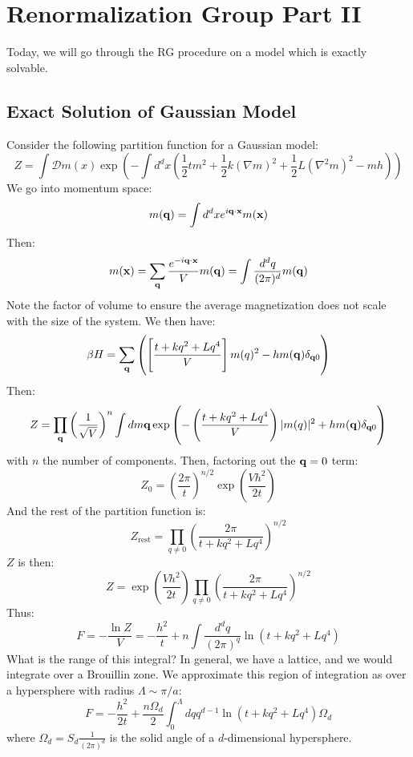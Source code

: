 \section{Renormalization Group Part II}
Today, we will go through the RG procedure on a model which is exactly solvable. 

\subsection{Exact Solution of Gaussian Model}
Consider the following partition function for a Gaussian model:
\begin{equation}
    Z = \int \mathcal{D}m(x)\exp\left(-\int d^dx \left(\frac{1}{2}tm^2 + \frac{1}{2}k(\nabla m)^2 + \frac{1}{2}L(\nabla^2 m)^2 - mh\right)\right)
\end{equation}
We go into momentum space:
\begin{equation}
    m(\mathbf{q}) = \int d^dx e^{i\mathbf{q} \cdot \mathbf{x}}m(\mathbf{x})
\end{equation}
Then:
\begin{equation}
    m(\mathbf{x}) = \sum_{\mathbf{q}}\frac{e^{-i\mathbf{q} \cdot \mathbf{x}}}{V}m(\mathbf{q}) = \int \frac{d^d q}{(2\pi)^d}m(\mathbf{q})
\end{equation}
Note the factor of volume to ensure the average magnetization does not scale with the size of the system. We then have:
\begin{equation}
    \beta H = \sum_{\mathbf{q}}\left(\left[\frac{t + kq^2 + Lq^4}{V}\right]m(q)^2 - hm(\mathbf{q})\delta_{\mathbf{q}0}\right)
\end{equation}
Then:
\begin{equation}
    Z = \prod_{\mathbf{q}}\left(\frac{1}{\sqrt{V}}\right)^n \int dm\mathbf{q} \exp\left(-\left(\frac{t + kq^2 + Lq^4}{V}\right)\lvert m(q) \rvert^2 + hm(\mathbf{q})\delta_{\mathbf{q}0}\right)
\end{equation}
with $n$ the number of components. Then, factoring out the $\mathbf{q} = 0$ term:
\begin{equation}
    Z_0 = \left(\frac{2\pi}{t}\right)^{n/2}\exp(\frac{Vh^2}{2t})
\end{equation}
And the rest of the partition function is:
\begin{equation}
    Z_{\text{rest}} = \prod_{q \neq 0}\left(\frac{2\pi}{t + kq^2 + Lq^4}\right)^{n/2}
\end{equation}
$Z$ is then:
\begin{equation}
    Z = \exp(\frac{Vh^2}{2t})\prod_{q\neq 0}\left(\frac{2\pi}{t + kq^2 + Lq^4}\right)^{n/2}
\end{equation}
Thus:
\begin{equation}
    F = -\frac{\ln Z}{V} = -\frac{h^2}{t} + n\int \frac{d^dq}{(2\pi)^q}\ln(t + kq^2 + Lq^4)
\end{equation}
What is the range of this integral? In general, we have a lattice, and we would integrate over a Brouillin zone. We approximate this region of integration as over a hypersphere with radius $\Lambda\sim \pi/a$:
\begin{equation}
    F = -\frac{h^2}{2t} + \frac{n\Omega_d}{2}\int_0^\Lambda dq q^{d-1}\ln(t + kq^2 + Lq^4)\Omega_d
\end{equation}
where $\Omega_d = S_d\frac{1}{(2\pi)^d}$ is the solid angle of a $d$-dimensional hypersphere. 

